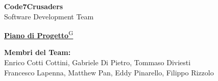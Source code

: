\documentclass{article}
\begin{document}
\begin{titlepage}
    {\Huge \textbf{Code7Crusaders}}\\
    \vspace{0.5cm}
    {\Large Software Development Team}\\
    \vspace{2cm}

    {\large \href{https://code7crusaders.github.io/docs/RTB/documentazione_interna/glossario.html#piano-di-progetto}{\textbf{Piano di Progetto}\textsuperscript{G}}}\\
    \vspace{5cm}


    \textbf{Membri del Team:}\\
    Enrico Cotti Cottini, Gabriele Di Pietro, Tommaso Diviesti \\
    Francesco Lapenna, Matthew Pan, Eddy Pinarello, Filippo Rizzolo \\
    \vspace{0.5cm}

    \vspace{1cm}
\end{titlepage}
\end{document}
